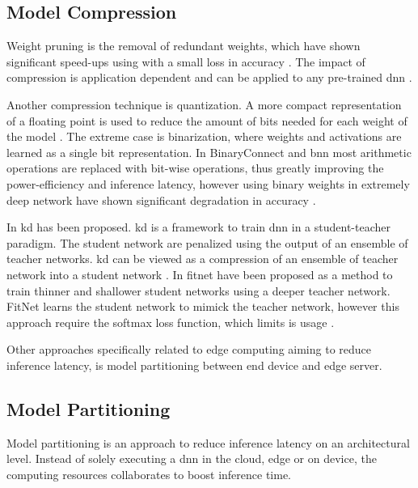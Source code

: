 \subsection{Model Compression}

Weight pruning is the removal of redundant weights, which have shown significant speed-ups using with a small loss in accuracy \cite{zhou_edge_2019}. The impact of compression is application dependent and can be applied to any pre-trained \gls{dnn} \cite{cheng_survey_2017}.

Another compression technique is quantization. A more compact representation of a floating point is used to reduce the amount of bits needed for each weight of the model \cite{cheng_survey_2017}. The extreme case is binarization, where weights and activations are learned as a single bit representation. In BinaryConnect \cite{courbariaux_binaryconnect:_2015} and \gls{bnn} \cite{courbariaux_binarized_2016} most arithmetic operations are replaced with bit-wise operations, thus greatly improving the power-efficiency and inference latency, however using binary weights in extremely deep network have shown significant degradation in accuracy \cite{cheng_survey_2017}.

In \cite{hinton_distilling_2015} \gls{kd} has been proposed. \gls{kd} is a framework to train \gls{dnn} in a student-teacher paradigm. The student network are penalized using the output of an ensemble of teacher networks. \gls{kd} can be viewed as a compression of an ensemble of teacher network into a student network \cite{cheng_survey_2017}. 
In \cite{romero_fitnets:_2014} \gls{fitnet} have been proposed as a method to train thinner and shallower student networks using a deeper teacher network. FitNet learns the student network to mimick the teacher network, however this approach require the softmax loss function, which limits is usage \cite{cheng_survey_2017}.  

Other approaches specifically related to edge computing aiming to reduce inference latency, is model partitioning between end device and edge server. 

\subsection{Model Partitioning}

Model partitioning is an approach to reduce inference latency on an architectural level. Instead of solely executing a \gls{dnn} in the cloud, edge or on device, the computing resources collaborates to boost inference time. 

